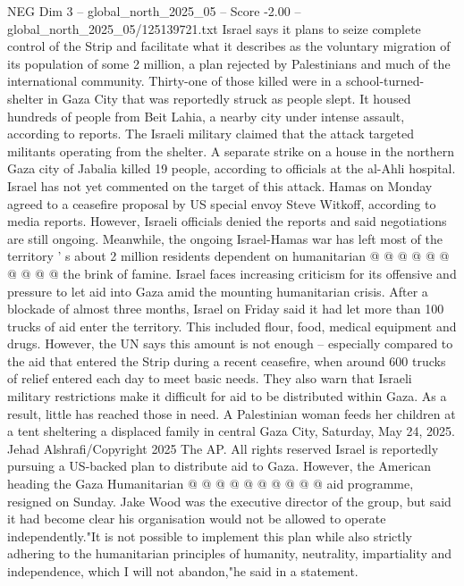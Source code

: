 \begin{textsample}{NEG Dim 3 – global\_north\_2025\_05 – Score -2.00 – global\_north\_2025\_05/125139721.txt}  \label{ex:f3_neg_314}
Israel says it plans to seize complete control of the Strip and facilitate what it describes as the voluntary migration of its population of some 2 million, a plan rejected by Palestinians and much of the international community.
Thirty-one of those killed were in a school-turned-shelter in Gaza City that was reportedly struck as people slept.
It housed hundreds of people from Beit Lahia, a nearby city under intense assault, according to reports.
The Israeli military claimed that the attack targeted militants operating from the shelter.
A separate strike on a house in the northern Gaza city of Jabalia killed 19 people, according to officials at the al-Ahli hospital.
Israel has not yet commented on the target of this attack.
Hamas on Monday agreed to a ceasefire proposal by US special envoy Steve Witkoff, according to media reports.
However, Israeli officials denied the reports and said negotiations are still ongoing.
Meanwhile, the ongoing Israel-Hamas war has left most of the territory ' s about 2 million residents dependent on humanitarian @ @ @ @ @ @ @ @ @ @ the brink of famine.
Israel faces increasing criticism for its offensive and pressure to let aid into Gaza amid the mounting humanitarian crisis.
After a blockade of almost three months, Israel on Friday said it had let more than 100 trucks of aid enter the territory.
This included flour, food, medical equipment and drugs.
However, the UN says this amount is not enough -- especially compared to the aid that entered the Strip during a recent ceasefire, when around 600 trucks of relief entered each day to meet basic needs.
They also warn that Israeli military restrictions make it difficult for aid to be distributed within Gaza.
As a result, little has reached those in need.
A Palestinian woman feeds her children at a tent sheltering a displaced family in central Gaza City, Saturday, May 24, 2025.
Jehad Alshrafi/Copyright 2025 The AP.
All rights reserved Israel is reportedly pursuing a US-backed plan to distribute aid to Gaza.
However, the American heading the Gaza Humanitarian @ @ @ @ @ @ @ @ @ @ aid programme, resigned on Sunday.
Jake Wood was the executive director of the group, but said it had become clear his organisation would not be allowed to operate independently."It is not possible to implement this plan while also strictly adhering to the humanitarian principles of humanity, neutrality, impartiality and independence, which I will not abandon,"he said in a statement.

\end{textsample}
